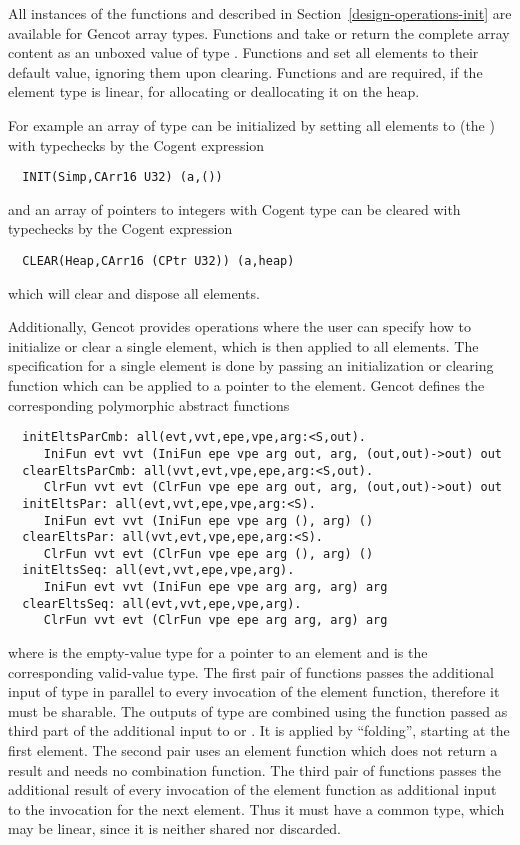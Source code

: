 All instances of the functions  and  described in 
Section~\ref{design-operations-init} are available
for Gencot array types. Functions  and  take or return the complete array content
as an unboxed value of type . Functions  and  set all elements
to their default value, ignoring them upon clearing. Functions  and  
are required, if the element type is linear, for allocating or deallocating it on the heap.

For example an array  of type  can be initialized by setting all elements to  
(the ) with typechecks by the Cogent expression
\begin{verbatim}
  INIT(Simp,CArr16 U32) (a,())
\end{verbatim}
and an array  of pointers to integers with Cogent type  can be cleared with typechecks 
by the Cogent expression
\begin{verbatim}
  CLEAR(Heap,CArr16 (CPtr U32)) (a,heap)
\end{verbatim}
which will clear and dispose all elements.

Additionally, Gencot provides operations where the user can specify how to initialize or clear a single element, which is then
applied to all elements. The specification for a single element is done by passing an initialization or clearing function which
can be applied to a pointer to the element. Gencot defines the corresponding polymorphic abstract functions
\begin{verbatim}
  initEltsParCmb: all(evt,vvt,epe,vpe,arg:<S,out). 
     IniFun evt vvt (IniFun epe vpe arg out, arg, (out,out)->out) out
  clearEltsParCmb: all(vvt,evt,vpe,epe,arg:<S,out). 
     ClrFun vvt evt (ClrFun vpe epe arg out, arg, (out,out)->out) out
  initEltsPar: all(evt,vvt,epe,vpe,arg:<S). 
     IniFun evt vvt (IniFun epe vpe arg (), arg) ()
  clearEltsPar: all(vvt,evt,vpe,epe,arg:<S). 
     ClrFun vvt evt (ClrFun vpe epe arg (), arg) ()
  initEltsSeq: all(evt,vvt,epe,vpe,arg). 
     IniFun evt vvt (IniFun epe vpe arg arg, arg) arg
  clearEltsSeq: all(evt,vvt,epe,vpe,arg). 
     ClrFun vvt evt (ClrFun vpe epe arg arg, arg) arg
\end{verbatim}
where  is the empty-value type for a pointer to an element and  is the corresponding valid-value type.
The first pair of functions passes the additional input of type  in parallel to every invocation of the element function, 
therefore it must be sharable. The outputs of type  are combined using the function passed as third part of
the additional input to  or . It is applied by ``folding'', starting at the first element.
The second pair uses an element function which does not return a result and needs no combination function.
The third pair of functions passes the additional result of every invocation of the element function as additional input 
to the invocation for the next element. Thus it must have a common type, which may be linear, since it is neither shared nor
discarded. 

